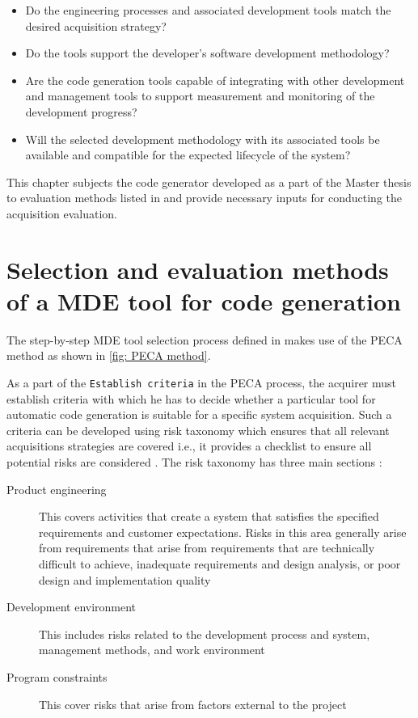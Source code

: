 \begin{itemize}
\item Do the engineering processes and associated development tools match the desired acquisition strategy?
\item Do the tools support the developer's software development methodology?
\item Are the code generation tools capable of integrating with other development and management tools to support measurement and monitoring of the development progress?
\item Will the selected development methodology with its associated tools be available and compatible for the expected lifecycle of the system? 
\end{itemize}

This chapter subjects the code generator developed as a part of the Master thesis to evaluation methods listed in \cite{EvalCodeGen} and provide necessary inputs for conducting the acquisition evaluation.

\section{Selection and evaluation methods of a MDE tool for code generation}
The step-by-step MDE tool selection process defined in \cite{EvalCodeGen} makes use of the PECA method \cite{PECAProcess} as shown in \cref{fig: PECA method}.  

As a part of the \texttt{Establish criteria} in the PECA process, the acquirer must establish criteria with which he has to decide whether a particular tool for automatic code generation is suitable for a specific system acquisition. Such a criteria can be developed using risk taxonomy \cite{RiskTax} which ensures that all relevant acquisitions strategies are covered i.e., it provides a checklist to ensure all potential risks are considered \cite{EvalCodeGen}. The risk taxonomy has three main sections \cite{RiskTax}:

\begin{description}
\item [Product engineering] This covers activities that create a system that satisfies the specified requirements and customer expectations. Risks in this area generally arise from requirements that arise from requirements that are technically difficult to achieve, inadequate requirements and design analysis, or poor design and implementation quality 
\item [Development environment] This includes risks related to the development process and system, management methods, and work environment
\item [Program constraints] This cover risks that arise from factors external to the project 
\end{description}

